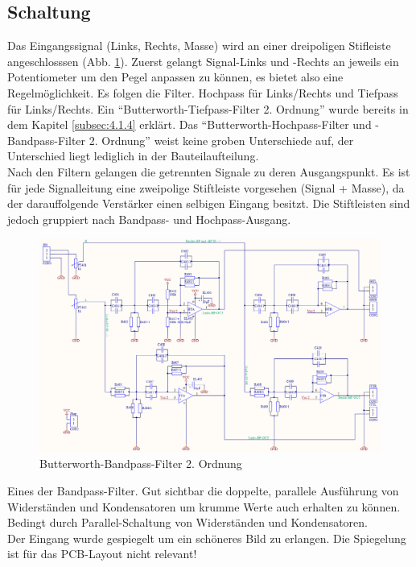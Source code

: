 \subsection{Schaltung}\label{subsec:4.2.4}
Das Eingangssignal (Links, Rechts, Masse) wird an einer dreipoligen Stifleiste angeschlosssen (Abb. \ref{fig:4.2.4.1}). Zuerst gelangt Signal-Links und -Rechts an jeweils ein Potentiometer um den Pegel anpassen zu können, es bietet also eine Regelmöglichkeit. Es folgen die Filter. Hochpass für Links/Rechts und Tiefpass für Links/Rechts. Ein \enquote{Butterworth-Tiefpass-Filter 2. Ordnung} wurde bereits in dem Kapitel \ref{subsec:4.1.4} erklärt. Das \enquote{Butterworth-Hochpass-Filter und -Bandpass-Filter 2. Ordnung} weist keine groben Unterschiede auf, der Unterschied liegt lediglich in der Bauteilaufteilung.\\
Nach den Filtern gelangen die getrennten Signale zu deren Ausgangspunkt. Es ist für jede Signalleitung eine zweipolige Stiftleiste vorgesehen (Signal + Masse), da der darauffolgende Verstärker einen selbigen Eingang besitzt. Die Stiftleisten sind jedoch gruppiert nach Bandpass- und Hochpass-Ausgang.\\
\begin{figure} [H]
	\centering	
	\includegraphics[width=1\textwidth]{img/Print4/4_TTuHTWeiche-Schematic.PNG}
	\caption{Butterworth-Bandpass-Filter 2. Ordnung}
	\label {fig:4.2.4.1}
\end{figure}
Eines der Bandpass-Filter. Gut sichtbar die doppelte, parallele Ausführung von Widerständen und Kondensatoren um krumme Werte auch erhalten zu können. Bedingt durch Parallel-Schaltung von Widerständen und Kondensatoren.\\ 
Der Eingang wurde gespiegelt um ein schöneres Bild zu erlangen. Die Spiegelung ist für das PCB-Layout nicht relevant!\\
